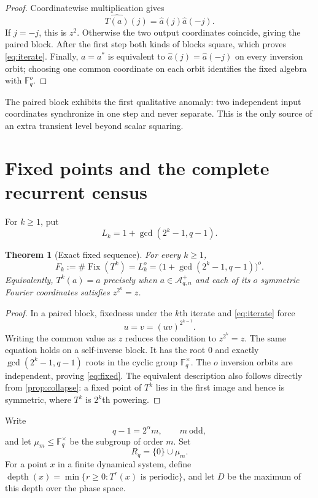 \documentclass[11pt,a4paper]{amsart}
\newcommand{\F}{\mathbb F}
\newcommand{\A}{\mathcal A}
\newcommand{\Fix}{\operatorname{Fix}}
\newcommand{\depth}{\operatorname{depth}}
\newcommand{\what}[1]{\widehat{#1}}
\newtheorem{theorem}{Theorem}[section]
\begin{document}
\begin{proof}
Coordinatewise multiplication gives
\[
 \what{T(a)}(j)=\what a(j)\what a(-j).
\]
If $j=-j$, this is $z^2$.  Otherwise the two output coordinates coincide,
giving the paired block.  After the first step both kinds of blocks square,
which proves \eqref{eq:iterate}.  Finally, $a=a^*$ is equivalent to
$\what a(j)=\what a(-j)$ on every inversion orbit; choosing one common
coordinate on each orbit identifies the fixed algebra with $\F_q^o$.
\end{proof}

The paired block exhibits the first qualitative anomaly: two independent
input coordinates synchronize in one step and never separate.  This is the
only source of an extra transient level beyond scalar squaring.

\section{Fixed points and the complete recurrent census}

For $k\geq1$, put
\begin{equation}
 \label{eq:Lk}
 L_k=1+\gcd(2^k-1,q-1).
\end{equation}

\begin{theorem}[Exact fixed sequence]
\label{thm:fixed}
For every $k\geq1$,
\begin{equation}
 \label{eq:fixed}
 F_k:=\#\Fix(T^k)=L_k^o
 =\bigl(1+\gcd(2^k-1,q-1)\bigr)^o.
\end{equation}
Equivalently, $T^k(a)=a$ precisely when $a\in\A_{q,n}^+$ and each of its
$o$ symmetric Fourier coordinates satisfies $z^{2^k}=z$.
\end{theorem}

\begin{proof}
In a paired block, fixedness under the $k$th iterate and
\cref{eq:iterate} force
\[
 u=v=(uv)^{2^{k-1}}.
\]
Writing the common value as $z$ reduces the condition to $z^{2^k}=z$.
The same equation holds on a self-inverse block.  It has the root $0$ and
exactly $\gcd(2^k-1,q-1)$ roots in the cyclic group $\F_q^\times$.  The $o$
inversion orbits are independent, proving \eqref{eq:fixed}.  The equivalent
description also follows directly from \cref{prop:collapse}: a fixed point of
$T^k$ lies in the first image and hence is symmetric, where $T^k$ is
$2^k$th powering.
\end{proof}

Write
\begin{equation}
 \label{eq:decomp}
 q-1=2^\alpha m,\qquad m\ \text{odd},
\end{equation}
and let $\mu_m\leq\F_q^\times$ be the subgroup of order $m$.  Set
\[
 R_q=\{0\}\cup\mu_m.
\]
For a point $x$ in a finite dynamical system, define
$\depth(x)=\min\{r\geq0:T^r(x)\text{ is periodic}\}$, and let $D$ be the
maximum of this depth over the phase space.
\end{document}
